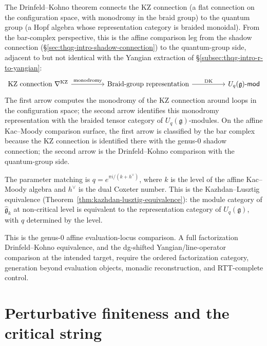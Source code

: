 The Drinfeld--Kohno theorem connects the KZ connection (a flat
connection on the configuration space, with monodromy in the braid
group) to the quantum group (a Hopf algebra whose representation
category is braided monoidal). From the bar-complex perspective, this
is the affine comparison leg from the shadow connection
(\S\ref{sec:thqg-intro-shadow-connection}) to the quantum-group side,
adjacent to but not identical with the Yangian extraction of
\S\ref{subsec:thqg-intro-r-to-yangian}:
\begin{equation}\label{eq:thqg-intro-dk-bridge}
\begin{tikzcd}[column sep=huge]
\text{KZ connection } \nabla^{\mathrm{KZ}}
 \arrow[r, "\text{monodromy}"]
& \text{Braid-group representation}
 \arrow[r, "\text{DK}"]
& U_q(\mathfrak{g})\text{-}\mathsf{mod}
\end{tikzcd}
\end{equation}
The first arrow computes the monodromy of the KZ connection around
loops in the configuration space; the second arrow identifies this
monodromy representation with the braided tensor category of
$U_q(\mathfrak{g})$-modules. On the affine Kac--Moody comparison
surface, the first arrow is classified by the bar complex because the
KZ connection is identified there with the genus-$0$ shadow
connection; the second arrow is the Drinfeld--Kohno comparison with the
quantum-group side.

The parameter matching is
$q = e^{\pi i / (k + h^\vee)}$, where $k$ is the level of the affine
Kac--Moody algebra and $h^\vee$ is the dual Coxeter number. This is
the Kazhdan--Lusztig equivalence
(Theorem~\ref{thm:kazhdan-lusztig-equivalence}): the module category
of $\widehat{\mathfrak{g}}_k$ at non-critical level is equivalent to
the representation category of $U_q(\mathfrak{g})$, with $q$ determined
by the level.

This is the genus-$0$ affine evaluation-locus comparison. A full
factorization Drinfeld--Kohno equivalence, and the dg-shifted
Yangian/line-operator comparison at the intended target, require the
ordered factorization category, generation beyond evaluation objects,
monadic reconstruction, and RTT-complete control.



\section{Perturbative finiteness and the critical string}
\label{sec:thqg-intro-perturbative-finiteness}

